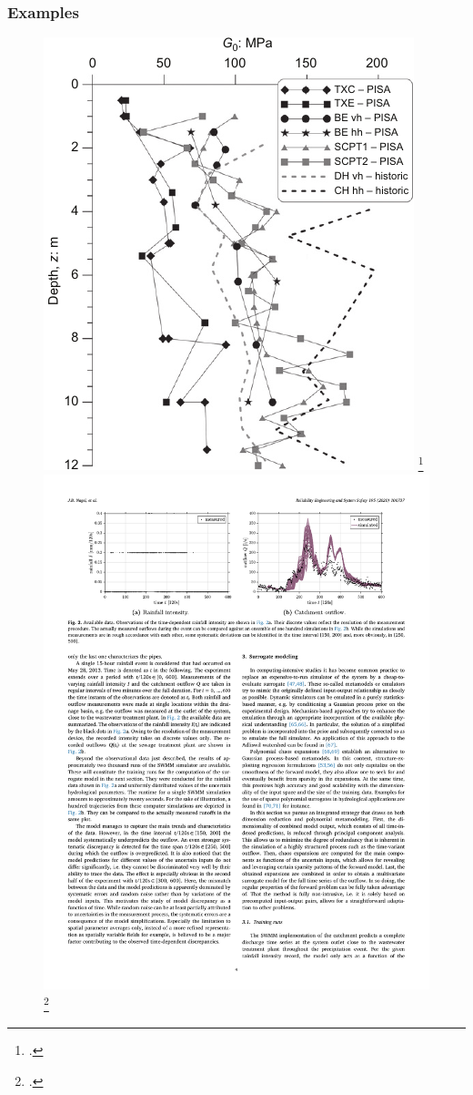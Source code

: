 \begin{frame}
\frametitle{Examples}
    \begin{figure}
    \centering
    \includegraphics[scale=0.7]{figures/figure-UQtype2.pdf}
    \tiny\footcite{zdravkovic2020}
    \hspace{1cm}
    \includegraphics[scale=0.8]{figures/figure-UQtype3.pdf}
    \tiny\footcite{nagel2020}  
    \end{figure}
\end{frame}
